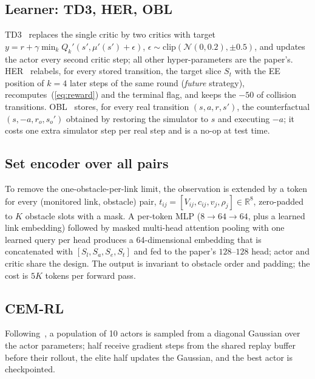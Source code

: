 \documentclass[conference]{IEEEtran}
\begin{document}
\subsection{Learner: TD3, HER, OBL}
TD3~\cite{fujimoto2018td3} replaces the single critic by two critics with target $y=r+\gamma\min_{k}Q_k'(s',\mu'(s')+\epsilon)$, $\epsilon\sim\mathrm{clip}(\mathcal N(0,0.2),\pm0.5)$, and updates the actor every second critic step; all other hyper-parameters are the paper's. HER~\cite{andrychowicz2017her} relabels, for every stored transition, the target slice $S_t$ with the EE position of $k=4$ later steps of the same round (\emph{future} strategy), recomputes~(\ref{eq:reward}) and the terminal flag, and keeps the $-50$ of collision transitions. OBL~\cite{tizhoosh2005obl} stores, for every real transition $(s,a,r,s')$, the counterfactual $(s,-a,r_o,s_o')$ obtained by restoring the simulator to $s$ and executing $-a$; it costs one extra simulator step per real step and is a no-op at test time.

\subsection{Set encoder over all pairs}
To remove the one-obstacle-per-link limit, the observation is extended by a token for every (monitored link, obstacle) pair, $t_{ij}=[V_{ij},c_{ij},v_j,\rho_j]\in\mathbb{R}^8$, zero-padded to $K$ obstacle slots with a mask. A per-token MLP ($8\to64\to64$, plus a learned link embedding) followed by masked multi-head attention pooling with one learned query per head produces a 64-dimensional embedding that is concatenated with $[S_l,S_a,S_e,S_t]$ and fed to the paper's $128$--$128$ head; actor and critic share the design. The output is invariant to obstacle order and padding; the cost is $5K$ tokens per forward pass.

\subsection{CEM-RL}
Following~\cite{pourchot2019cemrl}, a population of 10 actors is sampled from a diagonal Gaussian over the actor parameters; half receive gradient steps from the shared replay buffer before their rollout, the elite half updates the Gaussian, and the best actor is checkpointed.
\end{document}
